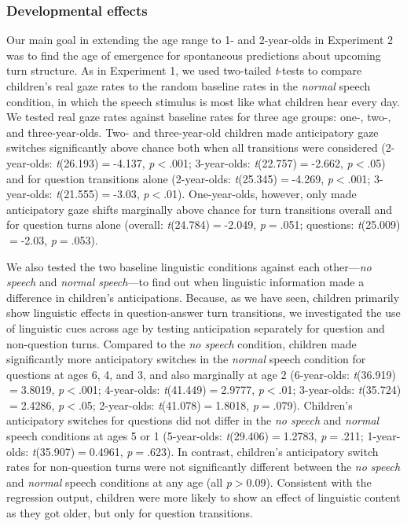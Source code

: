 \documentclass[authoryear, 12pt]{elsarticle}
\begin{document}
\subsubsection*{Developmental effects}

Our main goal in extending the age range to 1- and 2-year-olds in Experiment 2 was to find the age of emergence for spontaneous predictions about upcoming turn structure. As in Experiment 1, we used two-tailed \textit{t}-tests to compare children's real gaze rates to the random baseline rates in the \textit{normal} speech condition, in which the speech stimulus is most like what children hear every day. We tested real gaze rates against baseline rates for three age groups: one-, two-, and three-year-olds. Two- and three-year-old children made anticipatory gaze switches significantly above chance both when all transitions were considered (2-year-olds: \textit{t}(26.193)$=$-4.137, \textit{p}$<$.001; 3-year-olds: \textit{t}(22.757)$=$-2.662, \textit{p}$<$.05) and for question transitions alone (2-year-olds: \textit{t}(25.345)$=$-4.269, \textit{p}$<$.001; 3-year-olds: \textit{t}(21.555)$=$-3.03, \textit{p}$<$.01). One-year-olds, however, only made anticipatory gaze shifts marginally above chance for turn transitions overall and for question turns alone (overall: \textit{t}(24.784)$=$-2.049, \textit{p}$=$.051; questions: \textit{t}(25.009)$=$-2.03, \textit{p}$=$.053).

We also tested the two baseline linguistic conditions against each other---\textit{no speech} and \textit{normal speech}---to find out when linguistic information made a difference in children's anticipations. Because, as we have seen, children primarily show linguistic effects in question-answer turn transitions, we investigated the use of linguistic cues across age by testing anticipation separately for question and non-question turns. Compared to the \textit{no speech} condition, children made significantly more anticipatory switches in the \textit{normal} speech condition for questions at ages 6, 4, and 3, and also marginally at age 2 (6-year-olds: \textit{t}(36.919)$=$3.8019, \textit{p}$<$.001; 4-year-olds: \textit{t}(41.449)$=$2.9777, \textit{p}$<$.01; 3-year-olds: \textit{t}(35.724)$=$2.4286, \textit{p}$<$.05; 2-year-olds: \textit{t}(41.078)$=$1.8018, \textit{p}$=$.079). Children's anticipatory switches for questions did not differ in the \textit{no speech} and \textit{normal} speech conditions at ages 5 or 1 (5-year-olds: \textit{t}(29.406)$=$1.2783, \textit{p}$=$.211; 1-year-olds: \textit{t}(35.907)$=$0.4961, \textit{p}$=$.623). In contrast, children's anticipatory switch rates for non-question turns were not significantly different between the \textit{no speech} and \textit{normal} speech conditions at any age (all \textit{p}$>$0.09). Consistent with the regression output, children were more likely to show an effect of linguistic content as they got older, but only for question transitions.
\end{document}
